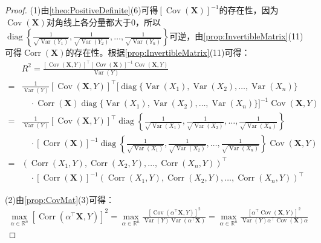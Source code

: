 \begin{proof}
	(1)由\cref{theo:PositiveDefinite}(6)可得$[\operatorname{Cov}(\mathbf{X})]^{-1}$的存在性，因为$\operatorname{Cov}(\mathbf{X})$对角线上各分量都大于$0$，所以$\operatorname{diag}\left\{\frac{1}{\sqrt{\operatorname{Var}(Y_1)}},\frac{1}{\sqrt{\operatorname{Var}(Y_2)}},\dots,\frac{1}{\sqrt{\operatorname{Var}(Y_n)}}\right\}$可逆，由\cref{prop:InvertibleMatrix}(11)可得$\operatorname{Corr}(\mathbf{X})$的存在性。根据\cref{prop:InvertibleMatrix}(11)可得：
	\begin{align*}
		&R^2=\frac{[\operatorname{Cov}(\mathbf{X},Y)]^{\top}[\operatorname{Cov}(\mathbf{X})]^{-1}\operatorname{Cov}(\mathbf{X},Y)}{\operatorname{Var}(Y)} \\
		=&\frac{1}{\operatorname{Var}(Y)}[\operatorname{Cov}(\mathbf{X},Y)]^{\top}[\operatorname{diag}\{\operatorname{Var}(X_1),\operatorname{Var}(X_2),\dots,\operatorname{Var}(X_n)\} \\
		&\quad\cdot\operatorname{Corr}(\mathbf{X})\operatorname{diag}\{\operatorname{Var}(X_1),\operatorname{Var}(X_2),\dots,\operatorname{Var}(X_n)\}]^{-1}\operatorname{Cov}(\mathbf{X},Y) \\
		=&\frac{1}{\operatorname{Var}(Y)}[\operatorname{Cov}(\mathbf{X},Y)]^{\top}\operatorname{diag}\left\{\frac{1}{\sqrt{\operatorname{Var}(X_1)}},\frac{1}{\sqrt{\operatorname{Var}(X_2)}},\dots,\frac{1}{\sqrt{\operatorname{Var}(X_n)}}\right\} \\
		&\quad\cdot[\operatorname{Corr}(\mathbf{X})]^{-1}\operatorname{diag}\left\{\frac{1}{\sqrt{\operatorname{Var}(X_1)}},\frac{1}{\sqrt{\operatorname{Var}(X_2)}},\dots,\frac{1}{\sqrt{\operatorname{Var}(X_n)}}\right\}\operatorname{Cov}(\mathbf{X},Y) \\
		=&(\operatorname{Corr}(X_1,Y),\operatorname{Corr}(X_2,Y),\dots,\operatorname{Corr}(X_n,Y))^{\top} \\
		&\quad\cdot[\operatorname{Corr}(\mathbf{X})]^{-1}(\operatorname{Corr}(X_1,Y),\operatorname{Corr}(X_2,Y),\dots,\operatorname{Corr}(X_n,Y))^{\top}
	\end{align*}\par
	(2)由\cref{prop:CovMat}(3)可得：
	\begin{align*}
		\max_{\alpha\in\mathbb{R}^{n}}[\operatorname{Corr}(\alpha ^{\top}\mathbf{X},Y)]^2=\max_{\alpha\in\mathbb{R}^{n}}\frac{[\operatorname{Cov}(\alpha^{\top}\mathbf{X},Y)]^2}{\operatorname{Var}(Y)\operatorname{Var}(\alpha^{\top}\mathbf{X})}=\max_{\alpha\in\mathbb{R}^{n}}\frac{[\alpha^{\top}\operatorname{Cov}(\mathbf{X},Y)]^2}{\operatorname{Var}(Y)\alpha^{\top}\operatorname{Cov}(\mathbf{X})\alpha}

\end{align*}
\end{proof}
